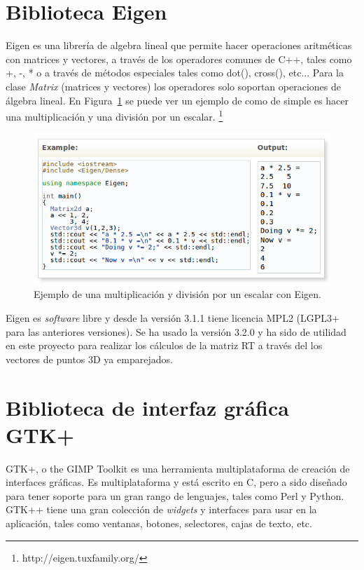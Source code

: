 \section{Biblioteca Eigen}
Eigen es una librería de algebra lineal que permite hacer operaciones aritméticas con matrices y vectores, a través de los operadores comunes de C++, tales como +, -, * o a través de métodos especiales tales como dot(), cross(), etc... Para la clase \textit{Matrix} (matrices y vectores) los operadores solo soportan operaciones de álgebra lineal. En Figura~\ref{fig:Eigen} se puede ver un ejemplo de como de simple es hacer una multiplicación y una división por un escalar. \footnote{http://eigen.tuxfamily.org/}

\begin{figure}[th]
\centering
\includegraphics[scale=0.65]{Figures/eigen-multiplication.png}
\decoRule
\caption[Ejemplo con Eigen]{Ejemplo de una multiplicación y división por un escalar con Eigen.}
\label{fig:Eigen}
\end{figure}

Eigen es \textit{software} libre y desde la versión 3.1.1 tiene licencia MPL2 (LGPL3+ para las anteriores versiones). Se ha usado la versión 3.2.0 y ha sido de utilidad en este proyecto para realizar los cálculos de la matriz RT a través del los vectores de puntos 3D ya emparejados.

\section{Biblioteca de interfaz gráfica GTK+}
GTK+, o the GIMP Toolkit es una herramienta multiplataforma de creación de interfaces gráficas. Es multiplataforma y está escrito en C, pero a sido diseñado para tener soporte para un gran rango de lenguajes, tales como Perl y Python. GTK++ tiene una gran colección de \textit{widgets} y interfaces para usar en la aplicación, tales como ventanas, botones, selectores, cajas de texto, etc.

